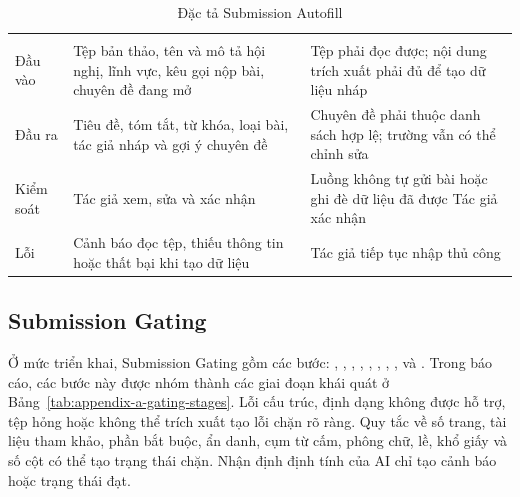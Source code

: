 \begin{longtable}{|T{0.20\textwidth}|T{0.32\textwidth}|T{0.38\textwidth}|}
\caption{Đặc tả Submission Autofill}\label{tab:appendix-a-autofill}\\
\hline
{} &  &  \\ \hline
\endfirsthead
\hline
{} &  &  \\ \hline
\endhead
Đầu vào & Tệp bản thảo, tên và mô tả hội nghị, lĩnh vực, kêu gọi nộp bài, chuyên đề đang mở & Tệp phải đọc được; nội dung trích xuất phải đủ để tạo dữ liệu nháp \\ \hline
Đầu ra & Tiêu đề, tóm tắt, từ khóa, loại bài, tác giả nháp và gợi ý chuyên đề & Chuyên đề phải thuộc danh sách hợp lệ; trường vẫn có thể chỉnh sửa \\ \hline
Kiểm soát & Tác giả xem, sửa và xác nhận & Luồng không tự gửi bài hoặc ghi đè dữ liệu đã được Tác giả xác nhận \\ \hline
Lỗi & Cảnh báo đọc tệp, thiếu thông tin hoặc thất bại khi tạo dữ liệu & Tác giả tiếp tục nhập thủ công \\ \hline
\end{longtable}

\subsection{Submission Gating}

Ở mức triển khai, Submission Gating gồm các bước: , , , , , , , ,  và . Trong báo cáo, các bước này được nhóm thành các giai đoạn khái quát ở Bảng~\ref{tab:appendix-a-gating-stages}. Lỗi cấu trúc, định dạng không được hỗ trợ, tệp hỏng hoặc không thể trích xuất tạo lỗi chặn rõ ràng. Quy tắc về số trang, tài liệu tham khảo, phần bắt buộc, ẩn danh, cụm từ cấm, phông chữ, lề, khổ giấy và số cột có thể tạo trạng thái chặn. Nhận định định tính của AI chỉ tạo cảnh báo hoặc trạng thái đạt.

